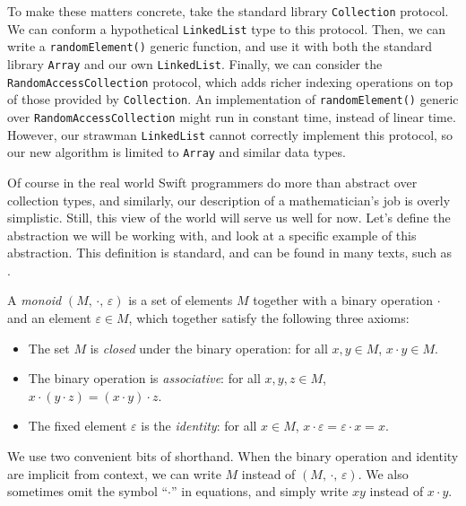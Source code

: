\documentclass[../generics]{subfiles}
\begin{document}
To make these matters concrete, take the standard library \texttt{Collection} protocol. We can conform a hypothetical \texttt{LinkedList} type to this protocol. Then, we can write a \texttt{randomElement()} generic function, and use it with both the standard library \texttt{Array} and our own \texttt{LinkedList}. Finally, we can consider the \texttt{RandomAccessCollection} protocol, which adds richer indexing operations on top of those provided by \texttt{Collection}. An implementation of \texttt{randomElement()} generic over \texttt{RandomAccessCollection} might run in constant time, instead of linear time. However, our strawman \texttt{LinkedList} cannot correctly implement this protocol, so our new algorithm is limited to \texttt{Array} and similar data types.

Of course in the real world Swift programmers do more than abstract over collection types, and similarly, our description of a mathematician's job is overly simplistic. Still, this view of the world will serve us well for now. Let's define the abstraction we will be working with, and look at a specific example of this abstraction. This definition is standard, and can be found in many texts, such as \cite{semigroup}.
\begin{definition}
%
%
%
%
%
A \emph{monoid} \index{$\cdot$}$(M,\, \cdot,\, \varepsilon)$ is a set of elements $M$ together with a binary operation $\cdot$ and an element $\varepsilon\in M$, which together satisfy the following three axioms:
\begin{itemize}
\item The set $M$ is \emph{closed} under the binary operation: for all $x, y \in M$, $x\cdot y\in M$.
\item The binary operation is \emph{associative}: for all $x, y, z \in M$, $x\cdot(y\cdot z)=(x\cdot y)\cdot z$.
\item The fixed element $\varepsilon$ is the \emph{identity}: for all $x\in M$, $x\cdot \varepsilon=\varepsilon\cdot x=x$.
\end{itemize}
We use two convenient bits of shorthand. When the binary operation and identity are implicit from context, we can write $M$ instead of $(M,\,\cdot,\,\varepsilon)$. We also sometimes omit the symbol ``$\cdot$'' in equations, and simply write $xy$ instead of $x\cdot y$.
\end{definition}
\end{document}

